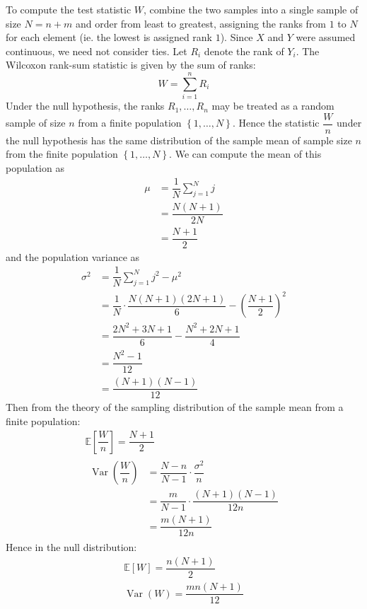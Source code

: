\documentclass[11pt]{report} %
\begin{document}
To compute the test statistic $W$, combine the two samples into a single sample of size $N = n + m$ and order from least to greatest, assigning the ranks from $1$ to $N$ for each element (ie. the lowest is assigned rank $1$). Since $X$ and $Y$ were assumed continuous, we need not consider ties. Let $R_{i}$ denote the rank of $Y_{i}$. The Wilcoxon rank-sum statistic is given by the sum of ranks:
\begin{equation}
W = \sum_{i = 1}^{n}R_{i}
\end{equation}
Under the null hypothesis, the ranks $R_{1}, \dots, R_{n}$ may be treated as a random sample of size $n$ from a finite population $\left\{1, \dots, N\right\}$. Hence the statistic $\dfrac{W}{n}$ under the null hypothesis has the same distribution of the sample mean of sample size $n$ from the finite population $\left\{1, \dots, N\right\}$. We can compute the mean of this population as
\begin{align}
\mu &= \dfrac{1}{N}\sum_{j = 1}^{N}j \\
&= \dfrac{N\left(N + 1\right)}{2N} \\
&= \dfrac{N + 1}{2}
\end{align}
and the population variance as
\begin{align}
\sigma^{2} &= \dfrac{1}{N}\sum_{j = 1}^{N}j^{2} - \mu^{2} \\
&= \dfrac{1}{N}\cdot\dfrac{N\left(N + 1\right)\left(2N + 1\right)}{6} - \left(\dfrac{N + 1}{2}\right)^{2} \\
&= \dfrac{2N^{2} + 3N + 1}{6} - \dfrac{N^{2} + 2N + 1}{4} \\
&= \dfrac{N^{2} - 1}{12} \\
&= \dfrac{\left(N + 1\right)\left(N - 1\right)}{12}
\end{align}
Then from the theory of the sampling distribution of the sample mean from a finite population:
\begin{gather}
\mathbb{E}\left[\dfrac{W}{n}\right] = \dfrac{N + 1}{2} \\
\begin{aligned}
\operatorname{Var}\left(\dfrac{W}{n}\right) &= \dfrac{N - n}{N - 1}\cdot\dfrac{\sigma^{2}}{n} \\
&= \dfrac{m}{N - 1}\cdot\dfrac{\left(N + 1\right)\left(N - 1\right)}{12n} \\
&= \dfrac{m\left(N + 1\right)}{12n}
\end{aligned}
\end{gather}
Hence in the null distribution:
\begin{gather}
\mathbb{E}\left[W\right] = \dfrac{n\left(N + 1\right)}{2} \\
\operatorname{Var}\left(W\right) = \dfrac{mn\left(N + 1\right)}{12}
\end{gather}
\end{document}
